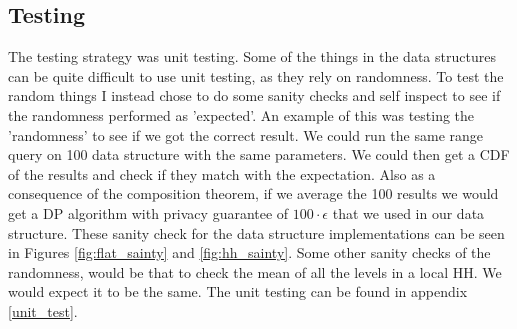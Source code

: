 \documentclass[11pt]{article}
\theoremstyle{definition}
\begin{document}
\subsection{Testing}
The testing strategy was unit testing. Some of the things in the data structures can be quite difficult to use unit testing, as they rely on randomness. To test the random things I instead chose to do some sanity checks and self inspect to see if the randomness performed as 'expected'. An example of this was testing the 'randomness' to see if we got the correct result. We could run the same range query on 100 data structure with the same parameters. We could then get a CDF of the results and check if they match with the expectation. Also as a consequence of the composition theorem, if we average the 100 results we would get a DP algorithm with privacy guarantee of $100\cdot\epsilon$ that we used in our data structure. These sanity check for the data structure implementations can be seen in Figures \ref{fig:flat_sainty} and \ref{fig:hh_sainty}. Some other sanity checks of the randomness, would be that to check the mean of all the levels in a local HH. We would expect it to be the same. The unit testing can be found in appendix \ref{unit_test}.
\end{document}
